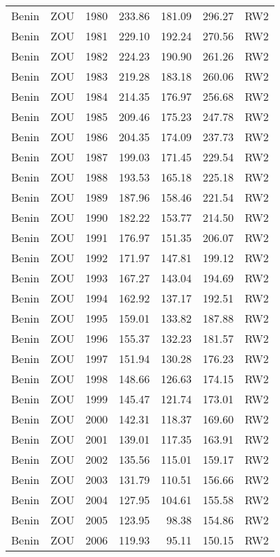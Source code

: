 \begin{longtable}{lllrrrl}
  Benin & ZOU & 1980 & 233.86 & 181.09 & 296.27 & RW2 \\ 
  Benin & ZOU & 1981 & 229.10 & 192.24 & 270.56 & RW2 \\ 
  Benin & ZOU & 1982 & 224.23 & 190.90 & 261.26 & RW2 \\ 
  Benin & ZOU & 1983 & 219.28 & 183.18 & 260.06 & RW2 \\ 
  Benin & ZOU & 1984 & 214.35 & 176.97 & 256.68 & RW2 \\ 
  Benin & ZOU & 1985 & 209.46 & 175.23 & 247.78 & RW2 \\ 
  Benin & ZOU & 1986 & 204.35 & 174.09 & 237.73 & RW2 \\ 
  Benin & ZOU & 1987 & 199.03 & 171.45 & 229.54 & RW2 \\ 
  Benin & ZOU & 1988 & 193.53 & 165.18 & 225.18 & RW2 \\ 
  Benin & ZOU & 1989 & 187.96 & 158.46 & 221.54 & RW2 \\ 
  Benin & ZOU & 1990 & 182.22 & 153.77 & 214.50 & RW2 \\ 
  Benin & ZOU & 1991 & 176.97 & 151.35 & 206.07 & RW2 \\ 
  Benin & ZOU & 1992 & 171.97 & 147.81 & 199.12 & RW2 \\ 
  Benin & ZOU & 1993 & 167.27 & 143.04 & 194.69 & RW2 \\ 
  Benin & ZOU & 1994 & 162.92 & 137.17 & 192.51 & RW2 \\ 
  Benin & ZOU & 1995 & 159.01 & 133.82 & 187.88 & RW2 \\ 
  Benin & ZOU & 1996 & 155.37 & 132.23 & 181.57 & RW2 \\ 
  Benin & ZOU & 1997 & 151.94 & 130.28 & 176.23 & RW2 \\ 
  Benin & ZOU & 1998 & 148.66 & 126.63 & 174.15 & RW2 \\ 
  Benin & ZOU & 1999 & 145.47 & 121.74 & 173.01 & RW2 \\ 
  Benin & ZOU & 2000 & 142.31 & 118.37 & 169.60 & RW2 \\ 
  Benin & ZOU & 2001 & 139.01 & 117.35 & 163.91 & RW2 \\ 
  Benin & ZOU & 2002 & 135.56 & 115.01 & 159.17 & RW2 \\ 
  Benin & ZOU & 2003 & 131.79 & 110.51 & 156.66 & RW2 \\ 
  Benin & ZOU & 2004 & 127.95 & 104.61 & 155.58 & RW2 \\ 
  Benin & ZOU & 2005 & 123.95 & 98.38 & 154.86 & RW2 \\ 
  Benin & ZOU & 2006 & 119.93 & 95.11 & 150.15 & RW2 \\ 

\end{longtable}

